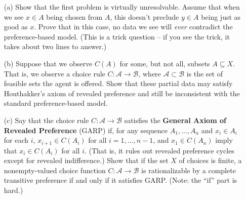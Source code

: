 \documentclass[12pt]{article}
\begin{document}
\begin{itemize}
    \item[(a)] Show that the first problem is virtually unresolvable. Assume that when we see $x \in A$ being chosen from $A$, this doesn't preclude $y \in A$ being just as good as $x$. Prove that in this case, no data we see will \emph{ever} contradict the preference-based model. (This is a trick question -- if you see the trick, it takes about two lines to answer.)

    \item[(b)] Suppose that we observe $C(A)$ for some, but not all, subsets $A \subseteq X$. That is, we observe a choice rule $C: \mathcal{A} \to \mathcal{B}$, where $\mathcal{A} \subset \mathcal{B}$ is the set of feasible sets the agent is offered. Show that these partial data may satisfy Houthakker's axiom of revealed preference and still be inconsistent with the standard preference-based model.

    \item[(c)] Say that the choice rule $C: \mathcal{A} \to \mathcal{B}$ satisfies the \textbf{General Axiom of Revealed Preference} (GARP) if, for any sequence $A_1,\dots,A_n$ and $x_i \in A_i$ for each $i$, $x_{i+1} \in C(A_i)$ for all $i = 1,\dots,n-1$, and $x_1 \in C(A_n)$ imply that $x_i \in C(A_i)$ for all $i$. (That is, it rules out revealed preference cycles except for revealed indifference.) Show that if the set $X$ of choices is finite, a nonempty-valued choice function $C: \mathcal{A} \to \mathcal{B}$ is rationalizable by a complete transitive preference if and only if it satisfies GARP. (Note: the ``if'' part is hard.)
\end{itemize}

\medskip
\end{document}
